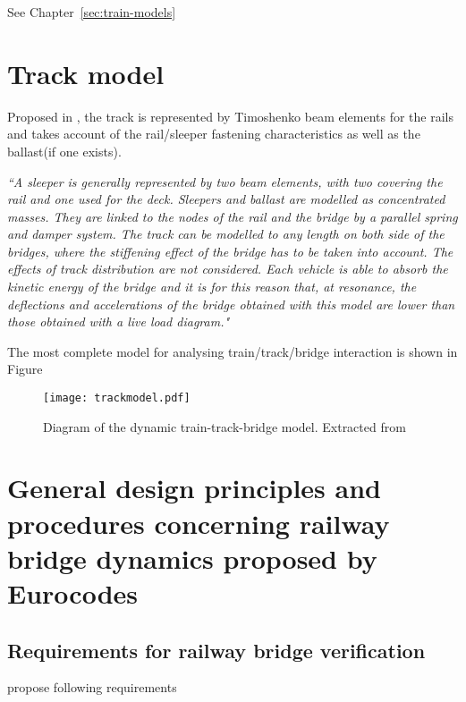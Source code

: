 See Chapter~\ref{sec:train-models}

\section{Track model}
Proposed in \cite[A.6.1.3]{uic}, the track is represented by Timoshenko beam elements for the rails and takes account of the rail/sleeper fastening characteristics as well as the ballast(if one exists).

\textit{``A sleeper is generally represented by two beam elements, with two covering the rail and one used for the deck. Sleepers and ballast are modelled as concentrated masses. They are linked to the nodes of the rail and the bridge by a parallel spring and damper system. The track can be modelled to any length on both side of the bridges, where the stiffening effect of the bridge has to be taken into account. The effects of track distribution are not considered. Each vehicle is able to absorb the kinetic energy of the bridge and it is for this reason that, at resonance, the deflections and accelerations of the bridge obtained with this model are lower than those obtained with a live load diagram."}

The most complete model for analysing train/track/bridge interaction is shown in Figure

\begin{figure}[h]
	\centering
	\texttt{[image: trackmodel.pdf]}
	\caption{Diagram of the dynamic train-track-bridge model. Extracted from \cite[Fig. 15]{uic}}
	\label{fig:trackmodel}
\end{figure}


\section{General design principles and procedures concerning railway bridge dynamics proposed by Eurocodes } \label{designprocedures}


\subsection{Requirements for railway bridge verification}
\cite{EC0} propose following requirements


